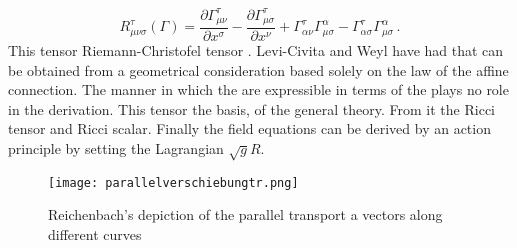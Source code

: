 {\begin{equation}\label{eq:riemanntensorgamma}
R_{\mu \nu \sigma}^{\tau}(\Gamma)=\frac{\partial \Gamma_{\mu \nu}^{\tau}}{\partial x^{\sigma}}-\frac{\partial \Gamma_{\mu \sigma}^{\tau}}{\partial x^{\nu}}+\Gamma_{\alpha \nu}^{\tau} \Gamma_{\mu \sigma}^{\alpha}-\Gamma_{\alpha \sigma}^{\tau} \Gamma_{\mu\sigma}^{\alpha}\,.	
\end{equation}
%
This tensor Riemann-Christofel tensor \riteg. Levi-Civita and Weyl have had that can be obtained from a geometrical consideration based solely on the law of the affine connection. The manner in which the \Gtmn are expressible in terms of the \gmn plays no role in the derivation. This tensor the basis, of the general theory. From it the Ricci tensor and Ricci scalar. Finally the field equations can be derived by an action principle by setting the Lagrangian $ \sqrt{g}R$.

\begin{figure}
\begin{center}
\texttt{[image: parallelverschiebungtr.png]}
\caption{Reichenbach's depiction of the parallel transport a vectors along different curves}
\end{center}
\end{figure}








}
